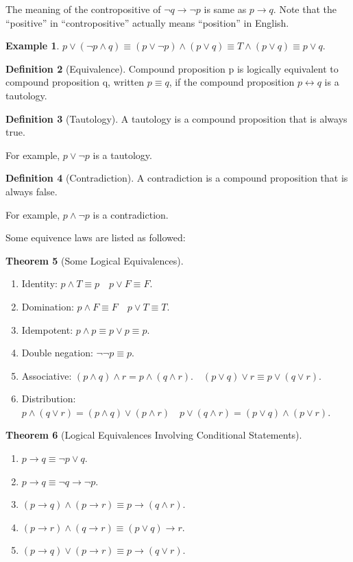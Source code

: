 \documentclass[12pt,a4paper]{report}
\theoremstyle{definition}
\newtheorem{theorem}{Theorem}[section]
\newtheorem{definition}[theorem]{Definition}
\newtheorem{example}[theorem]{Example}
\theoremstyle{remark}
\begin{document}
The meaning of the contropositive of $\neg q \rightarrow \neg p$ is same as $p \rightarrow q.$ Note that the ``positive'' in 
``contropositive'' actually means ``position'' in English.
\begin{example}
    $p \lor (\neg p \land q) \equiv (p \lor \neg p) \land (p \lor q) \equiv T \land (p \lor q) \equiv p \lor q.$
\end{example}


\begin{definition}[Equivalence]
    Compound proposition p is logically equivalent to compound proposition q, written $p \equiv q$, if the compound proposition $p \leftrightarrow q$ is a tautology.
\end{definition}

\begin{definition}[Tautology]
    A tautology is a compound proposition that is always true.
\end{definition}

For example, $p \lor \neg p$ is a tautology.


\begin{definition}[Contradiction]
    A contradiction is a compound proposition that is always false.
\end{definition}

For example, $p \land \neg p$ is a contradiction.

Some equivence laws are listed as followed:

\begin{theorem}[Some Logical Equivalences]
\mbox{}
\begin{enumerate}
    \item Identity: $p \land T \equiv p \quad p \lor F \equiv F.$
    \item Domination: $p \land F \equiv F \quad p \lor T \equiv T.$
    \item Idempotent: $p \land p \equiv p \lor p \equiv p.$
    \item Double negation: $\neg \neg p \equiv p.$
    \item Associative: $(p \land q) \land r = p \land (q \land r). \quad (p \lor q) \lor r \equiv p \lor (q \lor r).$
    \item Distribution: $p \land (q \lor r) = (p \land q) \lor (p \land r) \quad p \lor (q \land r) = (p \lor q) \land (p \lor r).$
\end{enumerate} 
\end{theorem}

\begin{theorem}[Logical Equivalences Involving Conditional Statements]
    \mbox{}
    \begin{enumerate}
        \item $p \to q \equiv \neg p \lor q.$
        \item $p \to q \equiv \neg q \to \neg p.$
        \item $(p \to q) \land (p \to r) \equiv p \to (q \land r).$
        \item $(p \to r) \land (q \to r) \equiv (p \lor q) \to r.$
        \item $(p \to q) \lor (p \to r) \equiv p \to (q \lor r).$
    \end{enumerate}
\end{theorem}
\end{document}
